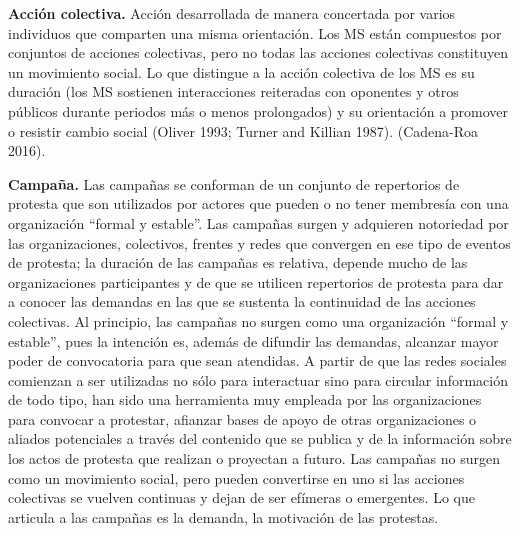 \documentclass[letterpaper, 11pt]{book}
\theoremstyle{definition}
\theoremstyle{remark}
\begin{document}
{\textbf{Acción colectiva.} \small{Acción desarrollada de manera concertada por varios individuos que comparten una misma orientación.
Los MS están compuestos por conjuntos de acciones colectivas, pero no todas las acciones colectivas constituyen un movimiento social.
Lo que distingue a la acción colectiva de los MS es su duración (los MS sostienen interacciones reiteradas con oponentes y otros públicos durante periodos más o menos prolongados) y su orientación a promover o resistir cambio social (Oliver 1993; Turner and Killian 1987).
(Cadena-Roa 2016).}\vspace{1em}


{\textbf{Campaña.} \small{Las campañas se conforman de un conjunto de repertorios de protesta que son utilizados por actores que pueden o no tener membresía con una organización ``formal y estable''.
Las campañas surgen y adquieren notoriedad por las organizaciones, colectivos, frentes y redes que convergen en ese tipo de eventos de protesta; la duración de las campañas es relativa, depende mucho de las organizaciones participantes y de que se utilicen repertorios de protesta para dar a conocer las demandas en las que se sustenta la continuidad de las acciones colectivas.
Al principio, las campañas no surgen como una organización ``formal y estable'', pues la intención es, además de difundir las demandas, alcanzar mayor poder de convocatoria para que sean atendidas.
A partir de que las redes sociales comienzan a ser utilizadas no sólo para interactuar sino para circular información de todo tipo, han sido una herramienta muy empleada por las organizaciones para convocar a protestar, afianzar bases de apoyo de otras organizaciones o aliados potenciales a través del contenido que se publica y de la información sobre los actos de protesta que realizan o proyectan a futuro.
Las campañas no surgen como un movimiento social, pero pueden convertirse en uno si las acciones colectivas se vuelven continuas y dejan de ser efímeras o emergentes.
Lo que articula a las campañas es la demanda, la motivación de las protestas.}\vspace{1em}


}}
\end{document}
